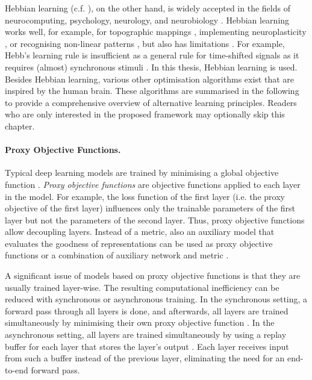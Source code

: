 Hebbian learning (c.f. ), on the other hand, is widely accepted in the fields of neurocomputing, psychology, neurology, and neurobiology .
Hebbian learning works well, for example, for topographic mappings , implementing neuroplasticity , or recognising non-linear patterns , but also has limitations \cite{anderson_biased_1998}.
For example, Hebb's learning rule is insufficient as a general rule for time-shifted signals as it requires (almost) synchronous stimuli .
In this thesis, Hebbian learning is used.
Besides Hebbian learning, various other optimisation algorithms exist that are inspired by the human brain. These algorithms are summarised in the following to provide a comprehensive overview of alternative learning principles. Readers who are only interested in the proposed framework may optionally skip this chapter.


\paragraph{Proxy Objective Functions.} Typical deep learning models are trained by minimising a global objective function \cite{prince_understanding_2023}. \emph{Proxy objective functions} \cite{mostafa_deep_2018, marquez_deep_2018, belilovsky_greedy_2019} are objective functions applied to each layer in the model. For example, the loss function of the first layer (i.e. the proxy objective of the first layer) influences only the trainable parameters of the first layer but not the parameters of the second layer.
Thus, proxy objective functions allow decoupling layers.
Instead of a metric, also an auxiliary model that evaluates the goodness of representations can be used as proxy objective functions \cite{duan_kernel_2020, duan_modularizing_2022, wang_revisiting_2021, belilovsky_greedy_2019, mostafa_deep_2018, marquez_deep_2018} or a combination of auxiliary network and metric .

A significant issue of models based on proxy objective functions is that they are usually trained layer-wise.
The resulting computational inefficiency can be reduced with synchronous or asynchronous training.
In the synchronous setting, a forward pass through all layers is done, and afterwards, all layers are trained simultaneously by minimising their own proxy objective function \cite{belilovsky_greedy_2019}.
In the asynchronous setting, all layers are trained simultaneously by using a replay buffer for each layer that stores the layer's output .
Each layer receives input from such a buffer instead of the previous layer, eliminating the need for an end-to-end forward pass.

